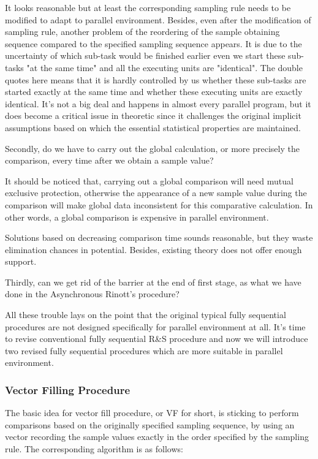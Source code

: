 It looks reasonable but at least the corresponding sampling rule needs to be modified to adapt to parallel environment. Besides, even after the modification of sampling rule, another problem of the reordering of the sample obtaining sequence compared to the specified sampling sequence appears. It is due to the uncertainty of which sub-task would be finished earlier even we start these sub-tasks "at the same time" and all the executing units are "identical". The double quotes here means that it is hardly controlled by us whether these sub-tasks are started exactly at the same time and whether these executing units are exactly identical. It's not a big deal and happens in almost every parallel program, but it does become a critical issue in theoretic since it challenges the original implicit assumptions based on which the essential statistical properties are maintained.

Secondly, do we have to carry out the global calculation, or more precisely the comparison, every time after we obtain a sample value?

It should be noticed that, carrying out a global comparison will need mutual exclusive protection, otherwise the appearance of a new sample value during the comparison will make global data inconsistent for this comparative calculation. In other words, a global comparison is expensive in parallel environment.

Solutions based on decreasing comparison time sounds reasonable, but they waste elimination chances in potential. Besides, existing theory does not offer enough support.

Thirdly, can we get rid of the barrier at the end of first stage, as what we have done in the Asynchronous Rinott's procedure?

All these trouble lays on the point that the original typical fully sequential procedures are not designed specifically for parallel environment at all. It's time to revise conventional fully sequential R\&S procedure and now we will introduce two revised fully sequential procedures which are more suitable in parallel environment.

\subsubsection{Vector Filling Procedure}

The basic idea for vector fill procedure, or VF for short, is sticking to perform comparisons based on the originally specified sampling sequence, by using an vector recording the sample values exactly in the order specified by the sampling rule. The corresponding algorithm is as follows:

